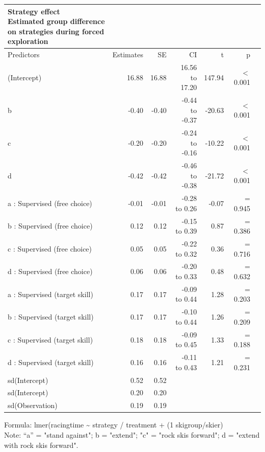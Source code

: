 \documentclass[pdflatex,sn-mathphys-num]{sn-jnl}%
\theoremstyle{thmstyleone}%
\theoremstyle{thmstyletwo}%
\theoremstyle{thmstylethree}%
\begin{document}
\begin{appendices}
\setlength{\LTpost}{0mm}
\begin{longtable}{lrrrrrl}
\caption*{
{\large Strategy effect} \\ 
{\small Estimated group difference on strategies during forced exploration}
} \\ 
\toprule
Predictors & Estimates & SE & CI & t & p \\
\midrule\addlinespace[2.5pt]
(Intercept) & 16.88 & 16.88 & 16.56 to 17.20 & 147.94 &  $<$  0.001 \\ 
b & -0.40 & -0.40 & -0.44 to -0.37 & -20.63 &  $<$  0.001 \\ 
c & -0.20 & -0.20 & -0.24 to -0.16 & -10.22 &  $<$  0.001 \\ 
d & -0.42 & -0.42 & -0.46 to -0.38 & -21.72 &  $<$  0.001 \\ 
a : Supervised (free choice) & -0.01 & -0.01 & -0.28 to 0.26 & -0.07 &  =  0.945 \\ 
b : Supervised (free choice) & 0.12 & 0.12 & -0.15 to 0.39 & 0.87 &  =  0.386 \\ 
c : Supervised (free choice) & 0.05 & 0.05 & -0.22 to 0.32 & 0.36 &  =  0.716 \\ 
d : Supervised (free choice) & 0.06 & 0.06 & -0.20 to 0.33 & 0.48 &  =  0.632 \\ 
a : Supervised (target skill) & 0.17 & 0.17 & -0.09 to 0.44 & 1.28 &  =  0.203 \\ 
b : Supervised (target skill) & 0.17 & 0.17 & -0.10 to 0.44 & 1.26 &  =  0.209 \\ 
c : Supervised (target skill) & 0.18 & 0.18 & -0.09 to 0.45 & 1.33 &  =  0.188 \\ 
d : Supervised (target skill) & 0.16 & 0.16 & -0.11 to 0.43 & 1.21 &  =  0.231 \\ 
sd(Intercept) & 0.52 & 0.52 &  &  &  &  \\ 
sd(Intercept) & 0.20 & 0.20 &  &  &  &  \\ 
sd(Observation) & 0.19 & 0.19 &  &  &  &  \\ 
\bottomrule
\end{longtable}
\begin{minipage}{\linewidth}
Formula: lmer(racingtime \textasciitilde{}  strategy / treatment + (1 \textbar{} skigroup/skier)\\
Note: “a” = "stand against"; b = "extend"; "c" = "rock skis forward"; d = "extend with rock skis forward".\\
\end{minipage}
\clearpage




\end{appendices}
\end{document}
